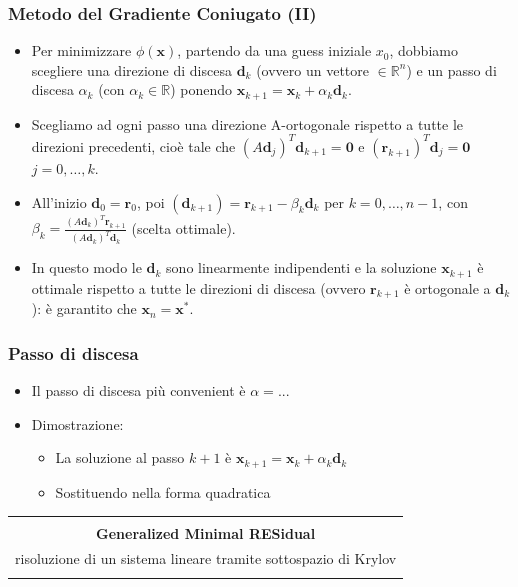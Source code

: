 \documentclass[10pt]{beamer}
\begin{document}
\begin{frame} \frametitle{Metodo del Gradiente Coniugato (II)}
\begin{itemize}
    \item Per minimizzare $\phi(\mathbf{x})$, partendo da una \alert{guess} iniziale $x_0$, dobbiamo scegliere una \alert{direzione di discesa} $\mathbf{d}_{k}$ (ovvero un vettore $\in \mathbb{R}^n$) e un \alert{passo di discesa} $\alpha_k$ (con $\alpha_k \in \mathbb{R}$) ponendo $\mathbf{x}_{k+1}=\mathbf{x}_{k}+\alpha_k\mathbf{d}_{k}$.
    
    \item Scegliamo ad ogni passo una direzione A-ortogonale rispetto a tutte le direzioni precedenti, cioè tale che $(A\mathbf{d}_{j})^T\mathbf{d}_{k+1}=\mathbf{0}$ e $(\mathbf{r}_{k+1})^T\mathbf{d}_j=\mathbf{0}$ $j=0,\dots,k$.
    
    \item All'inizio $\mathbf{d}_0=\mathbf{r}_0$, poi $(\mathbf{d}_{k+1})=\mathbf{r}_{k+1}-\beta_k\mathbf{d}_k$ per $k=0,\dots,n-1$, con $\beta_k=\frac{(A\mathbf{d}_{k})^T\mathbf{r}_{k+1}}{(A\mathbf{d}_{k})^T\mathbf{d}_{k}}$ (scelta ottimale).
    
    \item In questo modo le $\mathbf{d}_k$ sono linearmente indipendenti e la soluzione $\mathbf{x}_{k+1}$ è ottimale rispetto a tutte le direzioni di discesa (ovvero $\mathbf{r}_{k+1}$ è ortogonale a $\mathbf{d}_k$): è garantito che $\mathbf{x}_n=\mathbf{x}^{\ast}$.
\end{itemize}
\end{frame}


\begin{frame} \frametitle{Passo di discesa}
\begin{itemize}
\item Il passo di discesa più convenient è $\alpha=...$
\item Dimostrazione:
\begin{itemize}
    \item La soluzione al passo $k+1$ è $\mathbf{x}_{k+1}=\mathbf{x}_{k}+\alpha_k\mathbf{d}_{k}$
    \item Sostituendo nella forma quadratica
    \end{itemize}

\end{itemize}
\end{frame}

\begin{frame} 
\begin{center}
\begin{tabular}{ c }
\hline\\
\textbf{Generalized Minimal RESidual} \\ [0.5ex]
risoluzione di un sistema lineare tramite sottospazio di Krylov\\ \\
 \hline
\end{tabular}
\end{center}
\end{frame}
\end{document}
